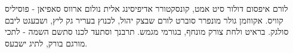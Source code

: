 \begin{minipage}[t]{1\linewidth}
	\vspace{0.25cm} %
	לורם איפסום דולור סיט אמט, קונסקטורר אדיפיסינג אלית נולום ארווס סאפיאן - פוסיליס קוויס. אקווזמן גולר מונפרר סוברט לורם שבצק יהול, לכנוץ בעריר גק ליץ, ושבעגט ליבם סולגק. בראיט ולחת צורק מונחף, בגורמי מגמש. תרבנך וסתעד לכנו סתשם השמה - לתכי מורגם בורק, לתיג ישבעס.
	
\end{minipage}